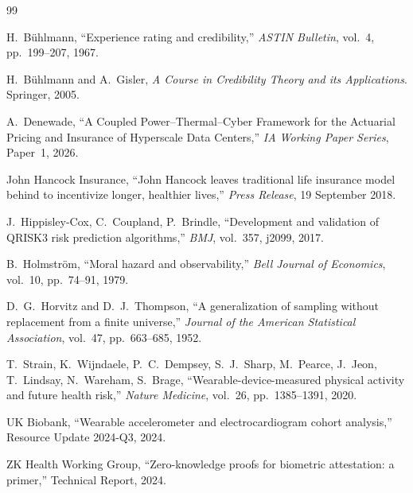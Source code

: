 \documentclass[11pt,a4paper]{article}
\theoremstyle{ia}
\newcommand{\1}{\mathbf{1}}
\begin{document}
\begin{thebibliography}{99}

H.~B\"uhlmann, ``Experience rating and credibility,''
\textit{ASTIN Bulletin}, vol.~4, pp.~199--207, 1967.

H.~B\"uhlmann and A.~Gisler, \textit{A Course in Credibility Theory
and its Applications}. Springer, 2005.

A.~Denewade, ``A Coupled Power--Thermal--Cyber Framework for the
Actuarial Pricing and Insurance of Hyperscale Data Centers,''
\textit{IA Working Paper Series}, Paper~1, 2026.

John Hancock Insurance, ``John Hancock leaves traditional life
insurance model behind to incentivize longer, healthier lives,''
\textit{Press Release}, 19 September 2018.

J.~Hippisley-Cox, C.~Coupland, P.~Brindle,
``Development and validation of QRISK3 risk prediction algorithms,''
\textit{BMJ}, vol.~357, j2099, 2017.

B.~Holmstr\"om, ``Moral hazard and observability,''
\textit{Bell Journal of Economics}, vol.~10, pp.~74--91, 1979.

D.~G.~Horvitz and D.~J.~Thompson, ``A generalization of sampling
without replacement from a finite universe,''
\textit{Journal of the American Statistical Association}, vol.~47,
pp.~663--685, 1952.

T.~Strain, K.~Wijndaele, P.~C.~Dempsey, S.~J.~Sharp, M.~Pearce,
J.~Jeon, T.~Lindsay, N.~Wareham, S.~Brage,
``Wearable-device-measured physical activity and future health risk,''
\textit{Nature Medicine}, vol.~26, pp.~1385--1391, 2020.

UK Biobank, ``Wearable accelerometer and electrocardiogram cohort
analysis,'' Resource Update 2024-Q3, 2024.

ZK Health Working Group, ``Zero-knowledge proofs for biometric
attestation: a primer,'' Technical Report, 2024.

\end{thebibliography}
\end{document}
